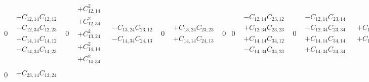 \documentclass[pra,nofootinbib]{revtex4-1}
\newcommand{\C}[2]{C_{{#1},{#2}}}
\begin{document}
\begin{eqnarray}
\begin{array}{cccccccccccccccc}
     0 &
     \begin{array}{c}
     + \C{12}{14}\C{12}{12} \\
     - \C{12}{34}\C{12}{23} \\
     + \C{14}{14}\C{14}{12} \\
     - \C{14}{34}\C{14}{23}
     \end{array} &
     0 &
     \begin{array}{c}
     + \C{12}{14}^2 \\
     + \C{12}{34}^2 \\
     + \C{13}{24}^2 \\
     + \C{14}{14}^2 \\
     + \C{14}{34}^2
     \end{array} &
     \begin{array}{c}
     - \C{13}{24}\C{23}{12} \\
     - \C{14}{34}\C{24}{13}
     \end{array} &
     0 &
     \begin{array}{c}
     + \C{13}{24}\C{23}{23} \\
     + \C{14}{14}\C{24}{13}
     \end{array} &
     0 &
     0 &
     \begin{array}{c}
     - \C{12}{14}\C{23}{12} \\
     + \C{12}{34}\C{23}{23} \\
     + \C{14}{14}\C{34}{12} \\
     - \C{14}{34}\C{34}{23}
     \end{array} &
     0 &
     \begin{array}{c}
     - \C{12}{14}\C{23}{14} \\
     - \C{12}{34}\C{23}{34} \\
     + \C{14}{14}\C{34}{14} \\
     + \C{14}{34}\C{34}{34}
     \end{array} &
     \begin{array}{c}
     + \C{12}{34}\C{24}{13} \\
     + \C{13}{24}\C{34}{12}
     \end{array} &
     0 &
     \begin{array}{c}
     - \C{12}{14}\C{24}{13} \\
     - \C{13}{24}\C{34}{23}
     \end{array} &
     0 \\
     0 &
     \begin{array}{c}
     + \C{23}{14}\C{13}{24} \\

\end{array}
\end{array}
\end{eqnarray}
\end{document}

